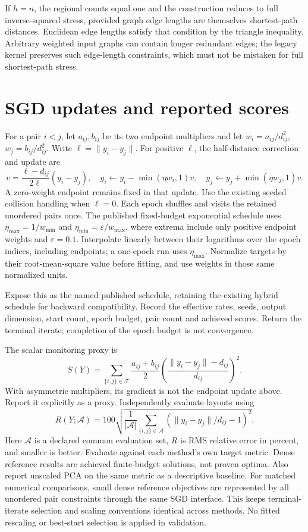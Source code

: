 \documentclass[11pt,letterpaper]{article}
\begin{document}
If $h=n$, the regional counts equal one and the construction reduces to full
inverse-squared stress, provided graph edge lengths are themselves shortest-path
distances. Euclidean edge lengths satisfy that condition by the triangle
inequality. Arbitrary weighted input graphs can contain longer redundant edges;
the legacy kernel preserves such edge-length constraints, which must not be
mistaken for full shortest-path stress.

\clearpage\section{SGD updates and reported scores}
For a pair $i<j$, let $a_{ij},b_{ij}$ be its two endpoint multipliers and let
$w_i=a_{ij}/d_{ij}^2$, $w_j=b_{ij}/d_{ij}^2$. Write $\ell=\|y_i-y_j\|$.
For positive $\ell$, the half-distance correction and update are
\[
v=\frac{\ell-d_{ij}}{2\ell}(y_i-y_j),\quad
 y_i\leftarrow y_i-\min(\eta w_i,1)v,\quad
 y_j\leftarrow y_j+\min(\eta w_j,1)v.
\]
A zero-weight endpoint remains fixed in that update. Use the existing seeded
collision handling when $\ell=0$. Each epoch shuffles and visits the retained
unordered pairs once. The published fixed-budget exponential schedule uses
$\eta_{\max}=1/w_{\min}$ and $\eta_{\min}=\varepsilon/w_{\max}$, where extrema
include only positive endpoint weights and $\varepsilon=0.1$. Interpolate
linearly between their logarithms over the epoch indices, including endpoints;
a one-epoch run uses $\eta_{\max}$. Normalize targets by their root-mean-square
value before fitting, and use weights in those same normalized units.

Expose this as the named published schedule, retaining the existing hybrid
schedule for backward compatibility. Record the effective rates, seeds, output
dimension, start count, epoch budget, pair count and achieved scores. Return the
terminal iterate; completion of the epoch budget is not convergence.

The scalar monitoring proxy is
\[
S(Y)=\sum_{\{i,j\}\in\mathcal F}\frac{a_{ij}+b_{ij}}{2}
 \left(\frac{\|y_i-y_j\|-d_{ij}}{d_{ij}}\right)^2.
\]
With asymmetric multipliers, its gradient is not the endpoint update above.
Report it explicitly as a proxy. Independently evaluate layouts using
\[
R(Y;\mathcal A)=100\sqrt{\frac1{|\mathcal A|}\sum_{\{i,j\}\in\mathcal A}
 (\|y_i-y_j\|/d_{ij}-1)^2}.
\]
Here $\mathcal A$ is a declared common evaluation set, $R$ is RMS relative error
in percent, and smaller is better. Evaluate against each method's own target
metric. Dense reference results are achieved finite-budget solutions, not proven
optima. Also report unscaled PCA on the same metric as a descriptive baseline.
For matched numerical comparisons, small dense reference objectives are
represented by all unordered pair constraints through the same SGD interface.
This keeps terminal-iterate selection and scaling conventions identical across
methods. No fitted rescaling or best-start selection is applied in validation.
\end{document}
